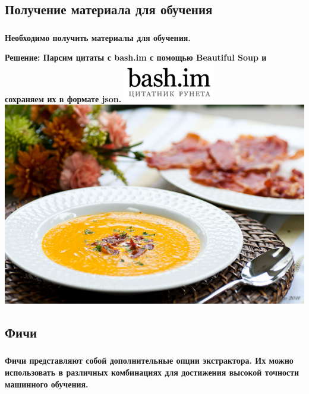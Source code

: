 \documentclass[t]{beamer}
\begin{document}
	\subsection{Получение материала для обучения}
	\begin{frame}
		\frametitle{\insertsection}
		\framesubtitle{\insertsubsection}
		\textbf{Необходимо получить материалы для обучения.}\pause
		
		\textbf{Решение: \newline Парсим цитаты с bash.im с помощью Beautiful Soup и сохраняем их в формате json.}
		\includegraphics[scale = 0.8]{images/bash_im.png}
		\includegraphics[scale = 0.3]{images/beautiful_soup.jpg}
	\end{frame}
	
	
	\subsection{Фичи}
	\begin{frame}
		\frametitle{\insertsection}
		\framesubtitle{\insertsubsection}
		\textbf{Фичи представляют собой дополнительные опции экстрактора. Их можно использовать в различных комбинациях для достижения высокой точности машинного обучения.}
	\end{frame}
	
	
\end{document}
